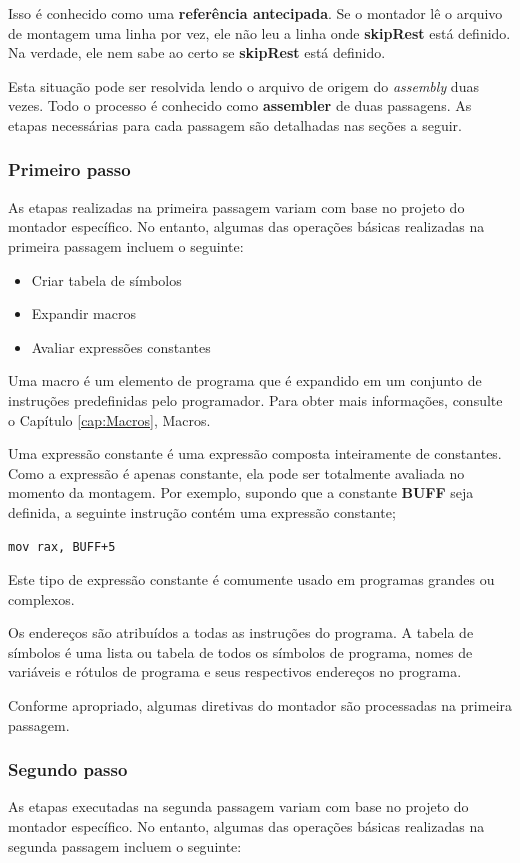 Isso é conhecido como uma \textbf{referência antecipada}. Se o montador lê o arquivo de montagem uma linha por vez, ele não leu a linha onde \textbf{skipRest} está definido. Na verdade, ele nem sabe ao certo se \textbf{skipRest} está definido.

Esta situação pode ser resolvida lendo o arquivo de origem do \textit{assembly} duas vezes. Todo o processo é conhecido como \textbf{assembler} de duas passagens. As etapas necessárias para cada passagem são detalhadas nas seções a seguir.

\subsubsection{Primeiro passo}
As etapas realizadas na primeira passagem variam com base no projeto do montador específico. No entanto, algumas das operações básicas realizadas na primeira passagem incluem o seguinte:

\begin{itemize}
	\item Criar tabela de símbolos
	\item Expandir macros
	\item Avaliar expressões constantes
\end{itemize}

Uma macro é um elemento de programa que é expandido em um conjunto de instruções predefinidas pelo programador. Para obter mais informações, consulte o Capítulo \ref{cap:Macros}, Macros.

Uma expressão constante é uma expressão composta inteiramente de constantes. Como a expressão é apenas constante, ela pode ser totalmente avaliada no momento da montagem. Por exemplo, supondo que a constante \textbf{BUFF} seja definida, a seguinte instrução contém uma expressão constante;
\begin{verbatim}
mov rax, BUFF+5
\end{verbatim}

Este tipo de expressão constante é comumente usado em programas grandes ou complexos.

Os endereços são atribuídos a todas as instruções do programa. A tabela de símbolos é uma lista ou tabela de todos os símbolos de programa, nomes de variáveis e rótulos de programa e seus respectivos endereços no programa.

Conforme apropriado, algumas diretivas do montador são processadas na primeira passagem.

\subsubsection{Segundo passo}
As etapas executadas na segunda passagem variam com base no projeto do montador específico. No entanto, algumas das operações básicas realizadas na segunda passagem incluem o seguinte:

